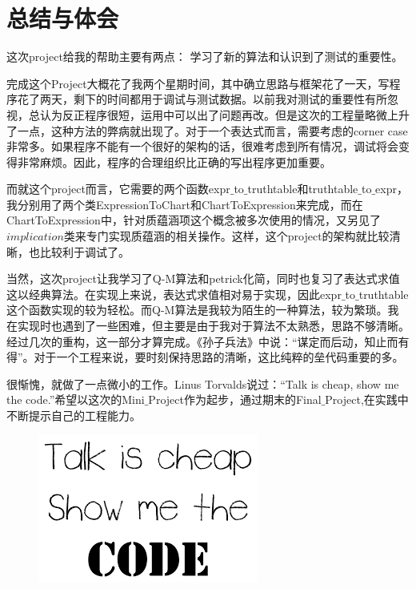 \section{总结与体会}

这次project给我的帮助主要有两点： 学习了新的算法和认识到了测试的重要性。

完成这个Project大概花了我两个星期时间，其中确立思路与框架花了一天，写程序花了两天，剩下的时间都用于调试与测试数据。以前我对测试的重要性有所忽视，总认为反正程序很短，运用中可以出了问题再改。但是这次的工程量略微上升了一点，这种方法的弊病就出现了。对于一个表达式而言，需要考虑的corner case非常多。如果程序不能有一个很好的架构的话，很难考虑到所有情况，调试将会变得非常麻烦。因此，程序的合理组织比正确的写出程序更加重要。

而就这个project而言，它需要的两个函数expr$\_$to$\_$truthtable和truthtable$\_$to$\_$expr，我分别用了两个类ExpressionToChart和ChartToExpression来完成，而在ChartToExpression中，针对质蕴涵项这个概念被多次使用的情况，又另见了$implication$类来专门实现质蕴涵的相关操作。这样，这个project的架构就比较清晰，也比较利于调试了。

当然，这次project让我学习了Q-M算法和petrick化简，同时也复习了表达式求值这以经典算法。在实现上来说，表达式求值相对易于实现，因此expr$\_$to$\_$truthtable这个函数实现的较为轻松。而Q-M算法是我较为陌生的一种算法，较为繁琐。我在实现时也遇到了一些困难，但主要是由于我对于算法不太熟悉，思路不够清晰。经过几次的重构，这一部分才算完成。《孙子兵法》中说：“谋定而后动，知止而有得”。对于一个工程来说，要时刻保持思路的清晰，这比纯粹的垒代码重要的多。

很惭愧，就做了一点微小的工作。Linus Torvalds说过：“Talk is cheap, show me the code.”希望以这次的Mini$\_$Project作为起步，通过期末的Final$\_$Project,在实践中不断提示自己的工程能力。

\vspace{2cm}

\begin{figure}[h]
	\centering
		\includegraphics[scale=0.8]{images/linus.png}
\end{figure}
